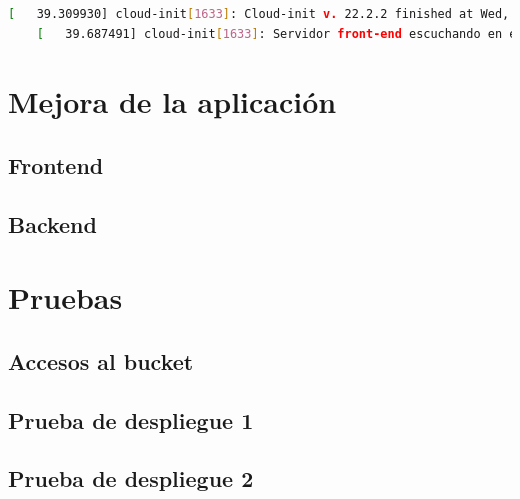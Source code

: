 \documentclass{article}
\begin{document}
 	\begin{lstlisting}[style=consola, language=bash, caption={front logs}]
	[   39.309930] cloud-init[1633]: Cloud-init v. 22.2.2 finished at Wed, 01 Oct 2025 21:42:02 +0000. Datasource DataSourceEc2.  Up 39.29 seconds
	[   39.687491] cloud-init[1633]: Servidor front-end escuchando en el puerto 80 \end{lstlisting}
	\section{Mejora de la aplicación}


	\subsection{Frontend}

	\subsection{Backend}


	\section{Pruebas}

	\subsection{Accesos al bucket}

	\subsection{Prueba de despliegue 1}


	\subsection{Prueba de despliegue 2}
\end{document}
